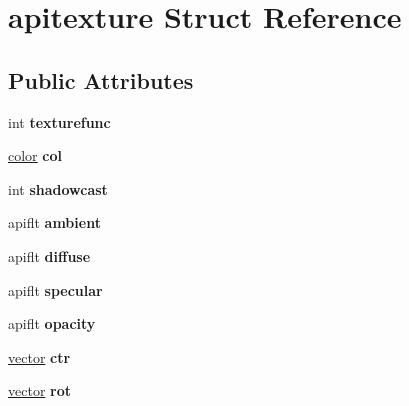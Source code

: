 \hypertarget{structapitexture}{}\section{apitexture Struct Reference}
\label{structapitexture}
\subsection*{Public Attributes}
\begin{DoxyCompactItemize}
\item 
\hypertarget{structapitexture_a45f9d5fc72cfc33994cf7f2586940e40}{}int {\bfseries texturefunc}\label{structapitexture_a45f9d5fc72cfc33994cf7f2586940e40}

\item 
\hypertarget{structapitexture_a33c284df7ab09b4485ac0b2b80850f00}{}\hyperlink{structcolor}{color} {\bfseries col}\label{structapitexture_a33c284df7ab09b4485ac0b2b80850f00}

\item 
\hypertarget{structapitexture_a3df98a8b37c63c223be5e5f26b4578f2}{}int {\bfseries shadowcast}\label{structapitexture_a3df98a8b37c63c223be5e5f26b4578f2}

\item 
\hypertarget{structapitexture_aaad2402856a2d9ead83bd38666f910e7}{}apiflt {\bfseries ambient}\label{structapitexture_aaad2402856a2d9ead83bd38666f910e7}

\item 
\hypertarget{structapitexture_a7595b0313e21e46687d41cddcf011f75}{}apiflt {\bfseries diffuse}\label{structapitexture_a7595b0313e21e46687d41cddcf011f75}

\item 
\hypertarget{structapitexture_a27e9215fe580a3e5df2662ac232ea4a0}{}apiflt {\bfseries specular}\label{structapitexture_a27e9215fe580a3e5df2662ac232ea4a0}

\item 
\hypertarget{structapitexture_a11751641936d0fd3711e0e6a023cf2c1}{}apiflt {\bfseries opacity}\label{structapitexture_a11751641936d0fd3711e0e6a023cf2c1}

\item 
\hypertarget{structapitexture_a9c0f3840340c7472589f908717dbec91}{}\hyperlink{structvector}{vector} {\bfseries ctr}\label{structapitexture_a9c0f3840340c7472589f908717dbec91}

\item 
\hypertarget{structapitexture_abdc1fc9006a2a1c6ba757e8654c5e6af}{}\hyperlink{structvector}{vector} {\bfseries rot}\label{structapitexture_abdc1fc9006a2a1c6ba757e8654c5e6af}


\end{DoxyCompactItemize}

